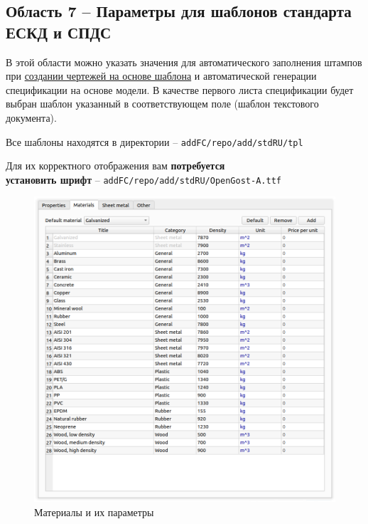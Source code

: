 \documentclass[a4paper,12pt]{article}
\begin{document}
\subsection{Область 7 -- Параметры для шаблонов стандарта ЕСКД и СПДС}
В этой области можно указать значения для автоматического заполнения штампов при \hyperref[sec:6]{создании чертежей на основе шаблона} и автоматической генерации спецификации на основе модели. В качестве первого листа спецификации будет выбран шаблон указанный в соответствующем поле (шаблон текстового документа).

Все шаблоны находятся в директории -- \verb|addFC/repo/add/stdRU/tpl|

Для их корректного отображения вам \textbf{потребуется\\установить шрифт} -- \verb|addFC/repo/add/stdRU/OpenGost-A.ttf|\\

\pagebreak


\begin{figure}[htp]
	\centering
	\includegraphics[width=1\textwidth]{img/pref_materials.png}
	\caption{Материалы и их параметры}
	\label{sec:pref_materials}
\end{figure}
\end{document}
